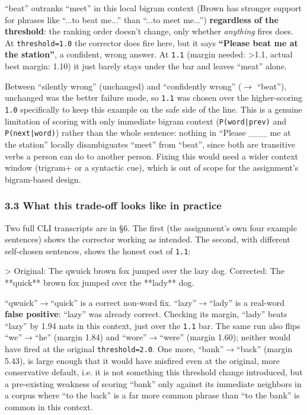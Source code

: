 \documentclass[11pt,a4paper]{article}
\begin{document}
``beat'' outranks ``meet'' in this local bigram context (Brown has stronger support for phrases like ``...to beat me...'' than ``...to meet me...'') \textbf{regardless of the threshold}: the ranking order doesn't change, only whether \textit{anything} fires does. At \texttt{threshold=1.\allowbreak{}0} the corrector does fire here, but it says \textbf{``Please beat me at the station''}, a confident, wrong answer. At \texttt{1.\allowbreak{}1} (margin needed: >1.1, actual best margin: 1.10) it just barely stays under the bar and leaves ``meat'' alone.

Between ``silently wrong'' (unchanged) and ``confidently wrong'' ($\rightarrow$ ``beat''), unchanged was the better failure mode, so \texttt{1.\allowbreak{}1} was chosen over the higher-scoring \texttt{1.\allowbreak{}0} specifically to keep this example on the safe side of the line. This is a genuine limitation of scoring with only immediate bigram context (\texttt{P(word|prev)} and \texttt{P(next|word)}) rather than the whole sentence: nothing in ``Please \_\_\_ me at the station'' locally disambiguates ``meet'' from ``beat'', since both are transitive verbs a person can do to another person. Fixing this would need a wider context window (trigram+ or a syntactic cue), which is out of scope for the assignment's bigram-based design.

\subsubsection*{3.3 What this trade-off looks like in practice}

Two full CLI transcripts are in \S{}6. The first (the assignment's own four example sentences) shows the corrector working as intended. The second, with different self-chosen sentences, shows the honest cost of \texttt{1.\allowbreak{}1}:

\begin{codeblock}
> Original:  The qwuick brown fox jumped over the lazy dog.
Corrected: The **quick** brown fox jumped over the **lady** dog.
\end{codeblock}

``qwuick''$\rightarrow$``quick'' is a correct non-word fix. ``lazy''$\rightarrow$``lady'' is a real-word \textbf{false positive}: ``lazy'' was already correct. Checking its margin, ``lady'' beats ``lazy'' by 1.94 nats in this context, just over the \texttt{1.\allowbreak{}1} bar. The same run also flips ``we''$\rightarrow$``he'' (margin 1.84) and ``wore''$\rightarrow$``were'' (margin 1.60); neither would have fired at the original \texttt{threshold=2.\allowbreak{}0}. One more, ``bank''$\rightarrow$``back'' (margin 5.43), is large enough that it would have misfired even at the original, more conservative default, i.e. it is not something this threshold change introduced, but a pre-existing weakness of scoring ``bank'' only against its immediate neighbors in a corpus where ``to the back'' is a far more common phrase than ``to the bank'' is common in this context.
\end{document}
